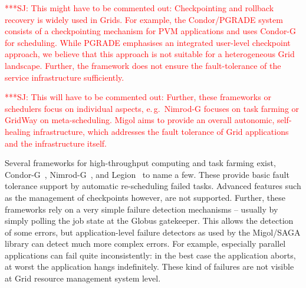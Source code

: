 \documentclass[times, 10pt, twocolumn]{article}
\newcommand{\jhanote}[1]{ {\textcolor{red} { ***SJ: #1 }}}
\newcommand{\jhanote}[1]{}
\newcommand{\up}{\vspace*{-1em}}
\begin{document}

\up
\jhanote{This might have to be commented out: Checkpointing and
  rollback recovery is widely used in Grids. For example, the
  Condor/PGRADE system~\cite{DBLP:conf/eagc/KovacsK04} consists of a
  checkpointing mechanism for PVM applications and uses
  Condor-G~\cite{citeulike:291860} for scheduling.  While PGRADE
  emphasises an integrated user-level checkpoint approach, we believe
  that this approach is not suitable for a heterogeneous Grid
  landscape. Further, the framework does not ensure the
  fault-tolerance of the service infrastructure sufficiently.}
                                 





\jhanote{This will have to be commented out: Further, these frameworks
  or schedulers focus on individual aspects, e.\,g.\ Nimrod-G focuses
  on task farming or GridWay on meta-scheduling. Migol aims to provide
  an overall autonomic, self-healing infrastructure, which addresses
  the fault tolerance of Grid applications and the infrastructure
  itself.}


 Several frameworks for
high-throughput computing and task farming exist,
Condor-G~\cite{citeulike:291860}, Nimrod-G~\cite{buyya00nimrodg}, and
Legion~\cite{689541} to name a few. These provide basic fault
tolerance support by automatic re-scheduling failed tasks. Advanced
features such as the management of checkpoints however, are not
supported. Further, these frameworks rely on a very simple failure
detection mechanisms -- usually by simply polling the job state at the
Globus gatekeeper. This allows the detection of some errors, but
application-level failure detectors as used by the Migol/SAGA library
can detect much more complex errors. For example, especially parallel
applications can fail quite inconsistently: in the best case the
application aborts, at worst the application hangs indefinitely. These
kind of failures are not visible at Grid resource management system
level.
\end{document}
